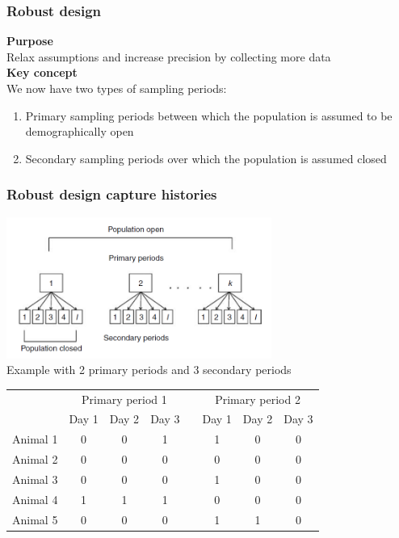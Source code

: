 \documentclass[color=usenames,dvipsnames]{beamer}\usepackage[]{graphicx}\usepackage[]{color}
\begin{document}
\begin{frame}
  \frametitle{Robust design}
  {\bf Purpose} \\
  Relax assumptions and increase precision by collecting more data \\
  \pause
  \vspace{0.5cm}
  {\bf Key concept} \\
  We now have two types of sampling periods:
  \begin{enumerate}[<+- | visible@+->][\bf \color{PineGreen} (1)]
    \item \alert{Primary sampling periods} between which the population
      is assumed to be demographically open
    \item \alert{Secondary sampling periods} over which the population
      is assumed closed
  \end{enumerate}
\end{frame}


\begin{frame}
  \frametitle{Robust design capture histories}
  \centering %
    \includegraphics[width=0.65\textwidth]{figs/robustDesign} \\
  \vfill
  \pause
  Example with 2 primary periods and 3 secondary periods \\
  \small
    \begin{tabular}{lccccccc}
      \hline
      & \multicolumn{3}{c}{Primary period 1} & &
        \multicolumn{3}{c}{Primary period 2} \\
      \cline{2-4} \cline{6-8}
      & Day 1 & Day 2 & Day 3 & & Day 1 & Day 2 & Day 3 \\
      \hline
      Animal 1 & 0 & 0 & 1 & & 1 & 0 & 0 \\
      Animal 2 & 0 & 0 & 0 & & 0 & 0 & 0 \\
      Animal 3 & 0 & 0 & 0 & & 1 & 0 & 0 \\
      Animal 4 & 1 & 1 & 1 & & 0 & 0 & 0 \\
      Animal 5 & 0 & 0 & 0 & & 1 & 1 & 0 \\
      \hline
    \end{tabular}
\end{frame}
\end{document}
